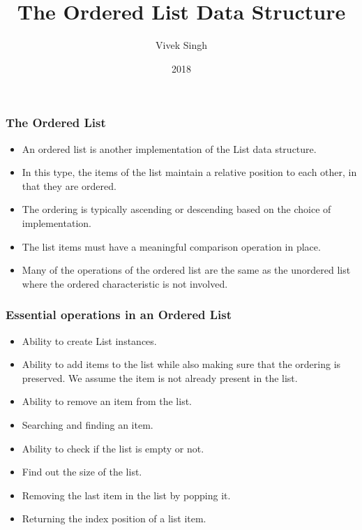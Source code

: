 \documentclass{beamer}
\title{The Ordered List Data Structure}
\author{Vivek Singh}
\institute{Information Systems Decision Sciences (ISDS)\\
MUMA College of Business\\
University of South Florida \\
Tampa, Florida}
\date{2018}
\begin{document}
 
\frame{\titlepage}
 

\begin{frame}
\frametitle{The Ordered List}
\begin{itemize}

\item An ordered list is another implementation of the List data structure.

\item In this type, the items of the list maintain a relative position to each other, in that they are ordered.

\item The ordering is typically ascending or descending based on the choice of implementation.

\item The list items must have a meaningful comparison operation in place.

\item Many of the operations of the ordered list are the same as the unordered list where the ordered characteristic is not involved.

\end{itemize}
\end{frame}
\begin{frame}
\frametitle{Essential operations in an Ordered List}
\begin{itemize}

\item Ability to create List instances.
\item Ability to add items to the list while also making sure that the ordering is preserved. We assume the item is not already present in the list.

\item Ability to remove an item from the list.
\item Searching and finding an item.
\item Ability to check if the list is empty or not.
\item Find out the size of the list.

\item Removing the last item in the list by popping it.

\item Returning the index position of a list item.
\end{itemize}
\end{frame}
\end{document}
